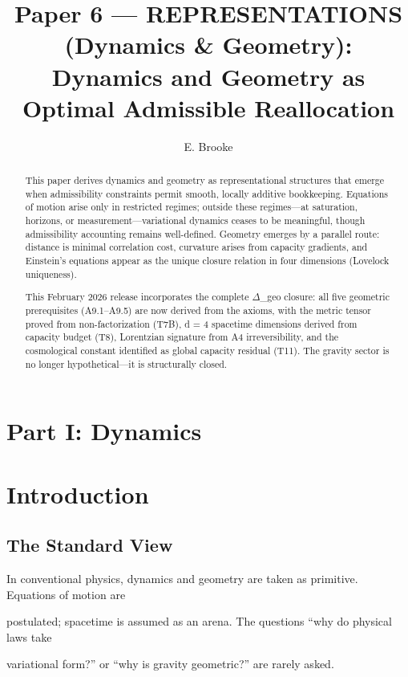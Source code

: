 \documentclass[11pt]{article}
\title{Paper 6 --- REPRESENTATIONS (Dynamics \& Geometry): Dynamics and Geometry as Optimal Admissible Reallocation}
\author{E. Brooke}
\date{}
\begin{document}
\maketitle
\begin{abstract}
This paper derives dynamics and geometry as representational structures that emerge when
 admissibility constraints permit smooth, locally additive bookkeeping. Equations of motion arise
 only in restricted regimes; outside these regimes---at saturation, horizons, or
 measurement---variational dynamics ceases to be meaningful, though admissibility accounting
 remains well-defined. Geometry emerges by a parallel route: distance is minimal correlation cost,
 curvature arises from capacity gradients, and Einstein’s equations appear as the unique closure
 relation in four dimensions (Lovelock uniqueness).

 This February 2026 release incorporates the complete $\Delta$_geo closure: all five geometric
 prerequisites (A9.1--A9.5) are now derived from the axioms, with the metric tensor proved from
 non-factorization (T7B), d = 4 spacetime dimensions derived from capacity budget (T8),
 Lorentzian signature from A4 irreversibility, and the cosmological constant identified as global
 capacity residual (T11). The gravity sector is no longer hypothetical---it is structurally closed.
\end{abstract}

\section*{Part I: Dynamics}



\section{Introduction}



\subsection{The Standard View}

In conventional physics, dynamics and geometry are taken as primitive. Equations of motion are

postulated; spacetime is assumed as an arena. The questions “why do physical laws take

variational form?” or “why is gravity geometric?” are rarely asked.
\end{document}
